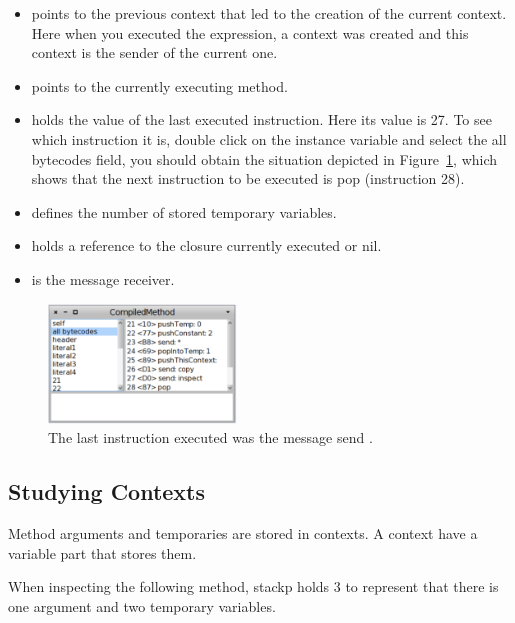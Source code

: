 \documentclass[a4paper,10pt,twoside]{book}
\begin{document}
\begin{itemize}
\item {} points to the previous context that led to the creation of the current context. Here when you executed the expression, a context was created and this context is the sender of the current one.

\item {} points to the currently executing method.

\item {} holds the value of the last executed instruction. Here its value is 27. To see which instruction it is, double click on the  instance variable and select the all bytecodes field, you should obtain the situation depicted in Figure~\ref{ByteCodes}, which shows that the next instruction to be executed is pop (instruction 28).

\item {} defines the number of stored temporary variables.

\item {} holds a reference to the closure currently executed or nil.

\item {} is the message receiver.
\end{itemize}

\begin{figure}[!h]
\begin{center}\includegraphics[width=5cm]{ByteCodes}
\caption{The last instruction executed was the message send .\label{ByteCodes}}
\end{center}
\end{figure}

\subsection{Studying Contexts}

Method arguments and temporaries are stored in contexts. A context have a variable part that
stores them.

When inspecting the following method, stackp holds 3 to represent that there is one argument
and two temporary variables.
\end{document}
